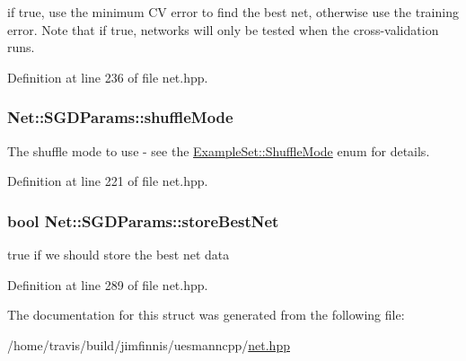 if true, use the minimum CV error to find the best net, otherwise use the training error. Note that if true, networks will only be tested when the cross-\/validation runs. 



Definition at line 236 of file net.\+hpp.

\subsubsection[{\texorpdfstring{shuffle\+Mode}{shuffleMode}}]{ Net\+::\+S\+G\+D\+Params\+::shuffle\+Mode}\hypertarget{structNet_1_1SGDParams_add028f3b43c05649c3fb7dc0fa5f1658}{}\label{structNet_1_1SGDParams_add028f3b43c05649c3fb7dc0fa5f1658}


The shuffle mode to use -\/ see the \hyperlink{classExampleSet_afcdcdbc9a02c53864997e334d8bae33d}{Example\+Set\+::\+Shuffle\+Mode} enum for details. 



Definition at line 221 of file net.\+hpp.

\subsubsection[{\texorpdfstring{store\+Best\+Net}{storeBestNet}}]{\setlength{\rightskip}{0pt plus 5cm}bool Net\+::\+S\+G\+D\+Params\+::store\+Best\+Net}\hypertarget{structNet_1_1SGDParams_a518755a6c39fa50f2e5683c3f495f1d0}{}\label{structNet_1_1SGDParams_a518755a6c39fa50f2e5683c3f495f1d0}


true if we should store the best net data 



Definition at line 289 of file net.\+hpp.



The documentation for this struct was generated from the following file\+:\begin{DoxyCompactItemize}
\item 
/home/travis/build/jimfinnis/uesmanncpp/\hyperlink{net_8hpp}{net.\+hpp}\end{DoxyCompactItemize}
